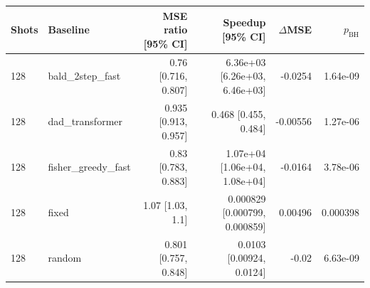 \begin{tabular}{llrrrr}
\toprule
Shots & Baseline & MSE ratio [95\% CI] & Speedup [95\% CI] & $\Delta$MSE & $p_{\mathrm{BH}}$ \\
\midrule
128 & bald\_2step\_fast & 0.76 [0.716, 0.807] & 6.36e+03 [6.26e+03, 6.46e+03] & -0.0254 & 1.64e-09 \\
128 & dad\_transformer & 0.935 [0.913, 0.957] & 0.468 [0.455, 0.484] & -0.00556 & 1.27e-06 \\
128 & fisher\_greedy\_fast & 0.83 [0.783, 0.883] & 1.07e+04 [1.06e+04, 1.08e+04] & -0.0164 & 3.78e-06 \\
128 & fixed & 1.07 [1.03, 1.1] & 0.000829 [0.000799, 0.000859] & 0.00496 & 0.000398 \\
128 & random & 0.801 [0.757, 0.848] & 0.0103 [0.00924, 0.0124] & -0.02 & 6.63e-09 \\
\bottomrule
\end{tabular}
